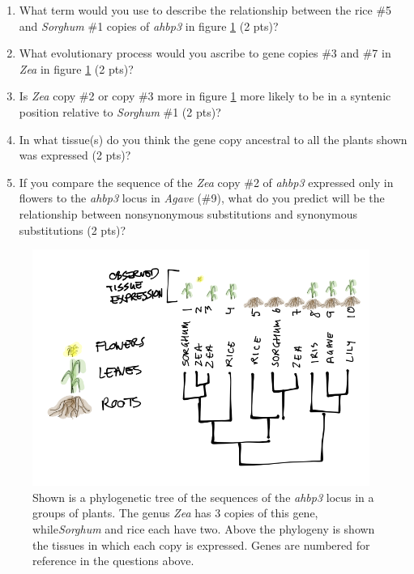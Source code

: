 \documentclass[]{article}
\begin{document}
\begin{enumerate}
\begin{enumerate}
\item What term would you use to describe the relationship between the  rice \#5 and \emph{Sorghum} \#1 copies of \emph{ahbp3} in figure \ref{duplicates}  (2 pts)? 
\item What evolutionary process would you ascribe to gene copies \#3 and \#7 in \emph{Zea} in figure \ref{duplicates} (2 pts)?
\item Is \emph{Zea} copy \#2 or copy \#3 more in figure \ref{duplicates} more likely to be in a syntenic position relative to \emph{Sorghum} \#1 (2 pts)?
\item In what tissue(s) do you think the gene copy ancestral to all the plants shown was expressed (2 pts)?
\item If you compare the sequence of the \emph{Zea} copy \#2 of \emph{ahbp3} expressed only in flowers to the \emph{ahbp3} locus in \emph{Agave} (\#9), what do you predict will be the relationship between nonsynonymous substitutions and synonymous substitutions (2 pts)?
\end{enumerate}

\begin{figure}[h]
  \begin{center}
   \includegraphics[width=110mm]{images/examfig2.png}
    \caption{Shown is a phylogenetic tree of the sequences of the \emph{ahbp3} locus in a groups of plants. The genus \emph{Zea} has 3 copies of this gene, while\emph{Sorghum} and rice each have two. Above the phylogeny is shown the tissues in which each copy is expressed. Genes are numbered for reference in the questions above.} 
\label{duplicates}
  \end{center}
\end{figure}


\end{enumerate}
\end{document}
